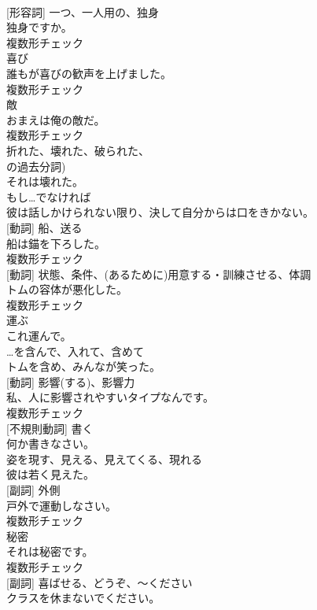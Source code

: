 \documentclass[8pt]{extreport}
\begin{document}
\begin{CJK}{UTF8}{min}
\\	[名詞] [形容詞]	一つ、一人用の、独身	
\\	独身ですか。	
\\	複数形チェック
\\	[名詞]	喜び	
\\	誰もが喜びの歓声を上げました。	
\\	複数形チェック
\\	[名詞]	敵	
\\	おまえは俺の敵だ。	
\\	複数形チェック
\\	[形容詞]	折れた、壊れた、破られた、
\\	の過去分詞)	
\\	それは壊れた。	
\\	[接続詞]	もし…でなければ	
\\	彼は話しかけられない限り、決して自分からは口をきかない。	
\\	[名詞] [動詞]	船、送る	
\\	船は錨を下ろした。	
\\	複数形チェック
\\	[名詞] [動詞]	状態、条件、(あるために)用意する・訓練させる、体調	
\\	トムの容体が悪化した。	
\\	複数形チェック
\\	[動詞]	運ぶ	
\\	これ運んで。	
\\	[前置詞]	…を含んで、入れて、含めて	
\\	トムを含め、みんなが笑った。	
\\	[名詞] [動詞]	影響(する)、影響力	
\\	私、人に影響されやすいタイプなんです。	
\\	複数形チェック
\\	[動詞] [不規則動詞]	書く	
\\	何か書きなさい。	
\\	[動詞]	姿を現す、見える、見えてくる、現れる	
\\	彼は若く見えた。	
\\	[名詞] [副詞]	外側	
\\	戸外で運動しなさい。	
\\	複数形チェック
\\	[名詞]	秘密	
\\	それは秘密です。	
\\	複数形チェック
\\	[動詞] [副詞]	喜ばせる、どうぞ、～ください	
\\	クラスを休まないでください。	

\end{CJK}
\end{document}
